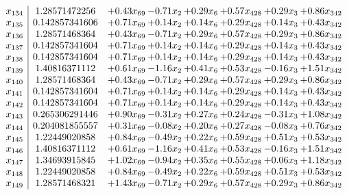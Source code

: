 \documentclass[8pt]{article}
\begin{document}
\[\begin{array}{c| c c@{\hskip 2pt} c@{\hskip 2pt} c@{\hskip 2pt} c@{\hskip 2pt} c@{\hskip 2pt} c@{\hskip 2pt} }
 x_{134}   &  1.28571472256 & +  0.43 x_{69} & -0.71 x_{2} & +  0.29 x_{6} & +  0.57 x_{428} & +  0.29 x_{3} & +  0.86 x_{342}\\
 x_{135}   &  0.142857341606 & +  0.71 x_{69} & +  0.14 x_{2} & +  0.14 x_{6} & +  0.29 x_{428} & +  0.14 x_{3} & +  0.43 x_{342}\\
 x_{136}   &  1.28571468364 & +  0.43 x_{69} & -0.71 x_{2} & +  0.29 x_{6} & +  0.57 x_{428} & +  0.29 x_{3} & +  0.86 x_{342}\\
 x_{137}   &  0.142857341604 & +  0.71 x_{69} & +  0.14 x_{2} & +  0.14 x_{6} & +  0.29 x_{428} & +  0.14 x_{3} & +  0.43 x_{342}\\
 x_{138}   &  0.142857341604 & +  0.71 x_{69} & +  0.14 x_{2} & +  0.14 x_{6} & +  0.29 x_{428} & +  0.14 x_{3} & +  0.43 x_{342}\\
 x_{139}   &  1.40816371112 & +  0.61 x_{69} & -1.16 x_{2} & +  0.41 x_{6} & +  0.53 x_{428} & -0.16 x_{3} & +  1.51 x_{342}\\
 x_{140}   &  1.28571468364 & +  0.43 x_{69} & -0.71 x_{2} & +  0.29 x_{6} & +  0.57 x_{428} & +  0.29 x_{3} & +  0.86 x_{342}\\
 x_{141}   &  0.142857341604 & +  0.71 x_{69} & +  0.14 x_{2} & +  0.14 x_{6} & +  0.29 x_{428} & +  0.14 x_{3} & +  0.43 x_{342}\\
 x_{142}   &  0.142857341604 & +  0.71 x_{69} & +  0.14 x_{2} & +  0.14 x_{6} & +  0.29 x_{428} & +  0.14 x_{3} & +  0.43 x_{342}\\
 x_{143}   &  0.265306291446 & +  0.90 x_{69} & -0.31 x_{2} & +  0.27 x_{6} & +  0.24 x_{428} & -0.31 x_{3} & +  1.08 x_{342}\\
 x_{144}   &  0.204081855557 & +  0.31 x_{69} & -0.08 x_{2} & +  0.20 x_{6} & +  0.27 x_{428} & -0.08 x_{3} & +  0.76 x_{342}\\
 x_{145}   &  1.22449020858 & +  0.84 x_{69} & -0.49 x_{2} & +  0.22 x_{6} & +  0.59 x_{428} & +  0.51 x_{3} & +  0.53 x_{342}\\
 x_{146}   &  1.40816371112 & +  0.61 x_{69} & -1.16 x_{2} & +  0.41 x_{6} & +  0.53 x_{428} & -0.16 x_{3} & +  1.51 x_{342}\\
 x_{147}   &  1.34693915845 & +  1.02 x_{69} & -0.94 x_{2} & +  0.35 x_{6} & +  0.55 x_{428} & +  0.06 x_{3} & +  1.18 x_{342}\\
 x_{148}   &  1.22449020858 & +  0.84 x_{69} & -0.49 x_{2} & +  0.22 x_{6} & +  0.59 x_{428} & +  0.51 x_{3} & +  0.53 x_{342}\\
 x_{149}   &  1.28571468321 & +  1.43 x_{69} & -0.71 x_{2} & +  0.29 x_{6} & +  0.57 x_{428} & +  0.29 x_{3} & +  0.86 x_{342}\\

\end{array}\]
\end{document}
